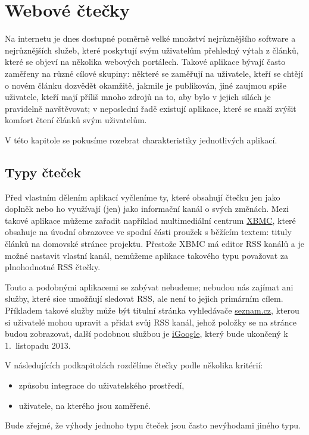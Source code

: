 \chapter{Webové čtečky}

Na internetu je dnes dostupné poměrně velké množství nejrůznějšího software a nejrůznějších služeb, které poskytují svým uživatelům přehledný výtah z článků, které se objeví na několika webových portálech.
Takové aplikace bývají často zaměřeny na různé cílové skupiny: některé se zaměřují na uživatele, kteří se chtějí o novém článku dozvědět okamžitě, jakmile je publikován, jiné zaujmou spíše uživatele, kteří mají příliš mnoho zdrojů na to, aby bylo v jejich silách je pravidelně navštěvovat; v neposlední řadě existují aplikace, které se snaží zvýšit komfort čtení článků svým uživatelům.

V této kapitole se pokusíme rozebrat charakteristiky jednotlivých aplikací.

\section{Typy čteček}

Před vlastním dělením aplikací vyčleníme ty, které obsahují čtečku  jen jako doplněk nebo ho využívají (jen) jako informační kanál o svých změnách.
Mezi takové aplikace můžeme zařadit například multimediální centrum \href{http://xbmc.org/}{XBMC}, které obsahuje na úvodní obrazovce ve spodní části proužek s běžícím textem: tituly článků na domovské stránce projektu.
Přestože XBMC má editor RSS kanálů a je možné nastavit vlastní kanál, nemůžeme aplikace takového typu považovat za plnohodnotné RSS čtečky.

Touto a podobnými aplikacemi se zabývat nebudeme; nebudou nás zajímat ani služby, které sice umožňují sledovat RSS, ale není to jejich primárním cílem.
Příkladem takové služby může být titulní stránka vyhledávače \href{http://seznam.cz}{seznam.cz}, kterou si uživatelé mohou upravit a přidat svůj RSS kanál, jehož položky se na stránce budou zobrazovat, další podobnou službou je \href{http://www.google.com/ig}{iGoogle}, který bude ukončený k 1.~listopadu 2013.

\bigskip

V následujících podkapitolách rozdělíme čtečky podle několika kritérií:
\begin{itemize}
	\item způsobu integrace do uživatelského prostředí,
	\item uživatele, na kterého jsou zaměřené.
\end{itemize}
Bude zřejmé, že výhody jednoho typu čteček jsou často nevýhodami jiného typu.

